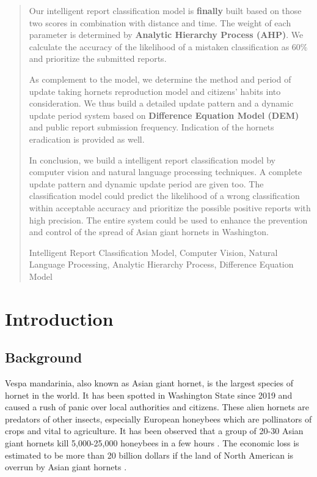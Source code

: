 \documentclass{mcmthesis}
\begin{document}
\begin{abstract}
		Our intelligent report classification model is \textbf{finally} built based on those two scores in combination with distance and time. The weight of each parameter is determined by \textbf{Analytic Hierarchy Process (AHP)}. We calculate the accuracy of the likelihood of a mistaken classification as $60\%$ and prioritize the submitted reports.
		
		As complement to the model, we determine the method and period of update taking  hornets reproduction model and citizens' habits into consideration. We thus build a detailed update pattern and a dynamic update period system based on \textbf{Difference Equation Model (DEM)} and public report submission frequency. Indication of the hornets eradication is provided as well.
		
		In conclusion, we build a  intelligent  report classification model by computer vision and natural language processing techniques. A complete update pattern and dynamic update period are given too. The classification model could predict the likelihood of a wrong classification within acceptable accuracy and prioritize the possible positive reports with high precision. The entire system could be used to enhance the prevention and control of the spread of Asian giant hornets in Washington.
	\begin{keywords}
	Intelligent Report Classification Model, Computer Vision, Natural Language Processing, Analytic Hierarchy Process, Difference Equation Model
	\end{keywords}
\end{abstract}

\maketitle

\tableofcontents
\newpage

\section{Introduction}
	\subsection{Background}
	Vespa mandarinia, also known as Asian giant hornet, is the largest species of hornet in the world. It has been spotted in Washington State since 2019 and caused a rush of panic over local authorities and citizens. These alien hornets are predators of other insects, especially  European honeybees which are pollinators of crops and vital to agriculture. It has been observed that a group of 20-30 Asian giant hornets kill 5,000-25,000 honeybees in a few hours \cite{intro0}. The economic loss is estimated to be more than 20 billion dollars if the land of North American is overrun by  Asian giant hornets \cite{intro1}. 
	
\end{document}
